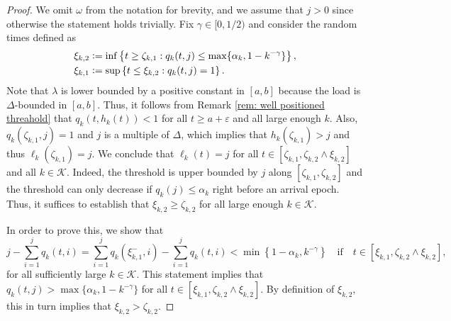 \documentclass[a4paper, 12pt]{article}
\theoremstyle{definition}
\newcommand{\set}[2]{\left\{#1 : #2\right\}}
\newcommand{\defeq}{\vcentcolon=}
\newcommand{\calK}{\mathcal{K}}
\begin{document}
\begin{proof}
We omit $\omega$ from the notation for brevity, and we assume that $j > 0$ since otherwise the statement holds trivially. Fix $\gamma \in [0, 1/2)$ and consider the random times defined as
\begin{align*}
	&\xi_{k, 2} \defeq \inf \set{t \geq \zeta_{k, 1}}{q_k(t, j) \leq \max\{\alpha_k, 1 - k^{-\gamma}\}}, \\
	&\xi_{k, 1} \defeq \sup \set{t \leq \xi_{k, 2}}{q_k(t, j) = 1}.
\end{align*}
Note that $\lambda$ is lower bounded by a positive constant in $[a, b]$ because the load is $\Delta$-bounded in $[a, b]$. Thus, it follows from Remark \ref{rem: well positioned threahold} that $q_k(t, h_k(t)) < 1$ for all $t \geq a + \varepsilon$ and all large enough $k$. Also, $q_k(\zeta_{k, 1}, j) = 1$ and $j$ is a multiple of $\Delta$, which implies that $h_k(\zeta_{k, 1}) > j$ and thus $\ell_k(\zeta_{k, 1}) = j$. We conclude that $\ell_k(t) = j$ for all $t \in \left[\zeta_{k, 1}, \zeta_{k, 2} \wedge \xi_{k, 2}\right]$ and all $k \in \calK$. Indeed, the threshold is upper bounded by $j$ along $\left[\zeta_{k, 1}, \zeta_{k, 2}\right]$ and the threshold can only decrease if $q_k(j) \leq \alpha_k$ right before an arrival epoch. Thus, it suffices to establish that $\xi_{k, 2} \geq \zeta_{k, 2}$ for all large enough $k \in \calK$.

In order to prove this, we show that
\begin{equation}
	\label{eq: statement to prove lemma}
	j - \sum_{i = 1}^j q_k(t, i) = \sum_{i = 1}^j q_k\left(\xi_{k, 1}^-, i\right) - \sum_{i = 1}^j q_k(t, i) < \min\left\{1 - \alpha_k, k^{-\gamma}\right\} \quad \text{if} \quad t \in \left[\xi_{k, 1}, \zeta_{k, 2} \wedge \xi_{k, 2}\right],
\end{equation}
for all sufficiently large $k \in \calK$. This statement implies that $q_k(t, j) > \max\{\alpha_k, 1 - k^{-\gamma}\}$ for all $t \in \left[\xi_{k, 1}, \zeta_{k, 2} \wedge \xi_{k, 2}\right]$.  By definition of $\xi_{k, 2}$, this in turn implies that $\xi_{k, 2} > \zeta_{k, 2}$.


\end{proof}
\end{document}
